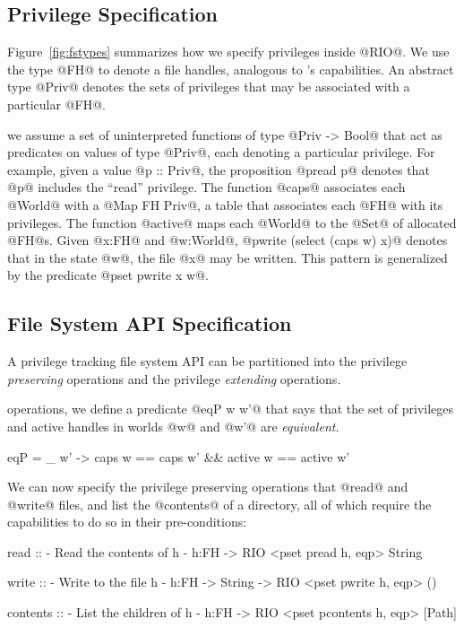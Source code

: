 \subsection{Privilege Specification}
\label{sec:privilege-spec}
%

Figure~\ref{fig:fstypes} summarizes how we specify privileges 
inside @RIO@. 
%
We use the type @FH@ to denote a file handles, analogous to \shill's
capabilities. An abstract type @Priv@ denotes the sets of privileges
that may be associated with a particular @FH@.

 we assume 
a set of uninterpreted functions of type @Priv ->  Bool@ 
that act as predicates on values of type @Priv@, each 
denoting a particular privilege.
%
For example, given a value @p :: Priv@, the proposition 
@pread p@ denotes that @p@ includes the ``read'' privilege.
%
The function @caps@ associates each @World@ with a @Map FH Priv@,
a table that associates each @FH@ with its privileges.
% 
The function @active@ maps each @World@ to the @Set@ of
allocated @FH@s.
%
Given @x:FH@ and @w:World@, @pwrite (select (caps w) x)@
denotes that in the state @w@, the file @x@ 
may be written.
%
This pattern is generalized by the predicate @pset pwrite x w@.

\subsection{File System API Specification}
\label{sec:fs-api}
%
A privilege tracking file system API can be partitioned into the
privilege \emph{preserving} operations and the privilege \emph{extending}
operations.

 operations, we define a predicate
@eqP w w'@ that says that the set of privileges and active handles
in worlds @w@ and @w'@ are \emph{equivalent}.
%
\begin{code}
  eqP = \w _ w' -> caps w == caps w' && active w == active w'
\end{code}
%
We can now specify the privilege preserving operations that @read@ and @write@ files, 
and list the @contents@ of a directory, all of which require the 
capabilities to do so in their pre-conditions:
%
\begin{code}
  read :: {- Read the contents of h -}
    h:FH -> RIO <pset pread h, eqp> String
  
  write :: {- Write to the file h -}
    h:FH -> String -> RIO <pset pwrite h, eqp> ()
  
  contents :: {- List the children of h -}
    h:FH -> RIO <pset pcontents h, eqp> [Path]
\end{code} 

